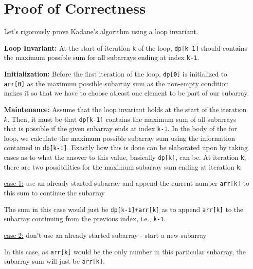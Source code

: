 
\section{Proof of Correctness}

\noindent Let's rigorously prove Kadane's algorithm using a loop invariant. \newline 

\noindent \textbf{Loop Invariant:} At the start of iteration \texttt{k} of the loop, \texttt{dp[k-1]} should contains the maximum possible sum for all subarrays ending at index \texttt{k-1}. \newline

\noindent \textbf{Initialization:} Before the first iteration of the loop, \texttt{dp[0]} is initialized to \texttt{arr[0]} as the maximum possible subarray sum as the non-empty condition makes it so that we have to choose atleast one element to be part of our subarray. \newline

\noindent \textbf{Maintenance:} Assume that the loop invariant holds at the start of the iteration $k$. Then, it must be that \texttt{dp[k-1]} contains the maximum sum of all subarrays that is possible if the given subarray ends at index \texttt{k-1}. In the body of the for loop, we calculate the maximum possible subarray sum using the information contained in \texttt{dp[k-1]}. Exactly how this is done can be elaborated upon by taking cases as to what the answer to this value, basically \texttt{dp[k]}, can be. At iteration \texttt{k}, there are two possibilities for the maximum subarray sum ending at iteration \texttt{k}: \newline 

\underline{case 1:} use an already started subarray and append the current number \texttt{arr[k]} to this sum to continue the subarray \newline 

\noindent The sum in this case would just be \texttt{dp[k-1]+arr[k]} as to append \texttt{arr[k]} to the subarray continuing from the previous index, i.e., \texttt{k-1}. \newline

\newline \underline{case 2:} don't use an already started subarray - start a new subarray \newline

\noindent In this case, as \texttt{arr[k]} would be the only number in this particular subarray, the subarray sum will just be \texttt{arr[k]}. \newline

